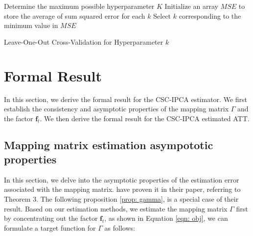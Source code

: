 \documentclass[12pt]{article}
\begin{document}
\begin{algorithm}[!ht]
    \SetAlgoLined
    Determine the maximum possible hyperparameter $K$\;
    Initialize an array $MSE$ to store the average of sum squared error for each $k$\;
      Select $k$ corresponding to the minimum value in $MSE$\;
    \caption{Leave-One-Out Cross-Validation for Hyperparameter $k$}
    \label{algorithm: 2}
\end{algorithm}

\section{Formal Result}
\label{sec: formal result}
In this section, we derive the formal result for the CSC-IPCA estimator. We first establish the consistency and asymptotic properties of the mapping matrix $\Gamma$ and the factor $\bm{f}_t$. We then derive the formal result for the CSC-IPCA estimated ATT. 

\subsection{Mapping matrix estimation asympototic properties}
In this section, we delve into the asymptotic properties of the estimation error associated with the mapping matrix. \cite{kelly2020instrumented} have proven it in their paper, referring to Theorem 3. The following proposition \ref{prop: gamma}, is a special case of their result. Based on our estimation methods, we estimate the mapping matrix $\Gamma$ first by concentrating out the factor $\bm{f}_t$, as shown in Equation \ref{eqn: obj}, we can formulate a target function for $\Gamma$ as follows:
\end{document}
